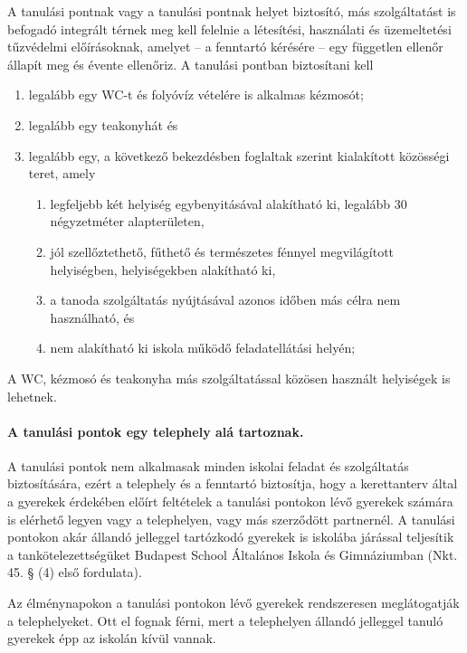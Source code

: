 A tanulási pontnak vagy a tanulási pontnak helyet biztosító, más szolgáltatást is befogadó integrált térnek meg kell felelnie a létesítési, használati és üzemeltetési tűzvédelmi előírásoknak, amelyet -- a fenntartó kérésére -- egy független ellenőr állapít meg és évente ellenőriz. A tanulási pontban biztosítani kell
\begin{enumerate}
    \item legalább egy WC-t és folyóvíz vételére is alkalmas kézmosót;
    \item legalább egy teakonyhát és
    \item   legalább egy, a következő bekezdésben foglaltak szerint kialakított közösségi teret, amely
    \begin{enumerate}
        \item legfeljebb két helyiség egybenyitásával alakítható ki, legalább 30 négyzetméter alapterületen,
        \item jól szellőztethető, fűthető és természetes fénnyel megvilágított helyiségben, helyiségekben alakítható ki,
        \item a tanoda szolgáltatás nyújtásával azonos időben más célra nem használható, és
        \item nem alakítható ki iskola működő feladatellátási helyén;
    \end{enumerate}
\end{enumerate}


A WC, kézmosó és teakonyha más szolgáltatással közösen használt helyiségek is lehetnek.

\paragraph{A tanulási pontok egy telephely alá tartoznak.}

A tanulási pontok nem alkalmasak minden iskolai feladat és szolgáltatás biztosítására, ezért a telephely és a fenntartó biztosítja, hogy a kerettanterv által a gyerekek érdekében előírt feltételek a tanulási pontokon lévő gyerekek számára is elérhető legyen vagy a telephelyen, vagy más szerződött partnernél. A tanulási pontokon akár állandó jelleggel tartózkodó gyerekek is iskolába járással teljesítik a tankötelezettségüket Budapest School Általános Iskola és Gimnáziumban (Nkt. 45. § (4) első fordulata).

Az élménynapokon a tanulási pontokon lévő gyerekek rendszeresen meglátogatják a telephelyeket. Ott el fognak férni, mert a telephelyen állandó jelleggel tanuló gyerekek épp az iskolán kívül vannak. 

